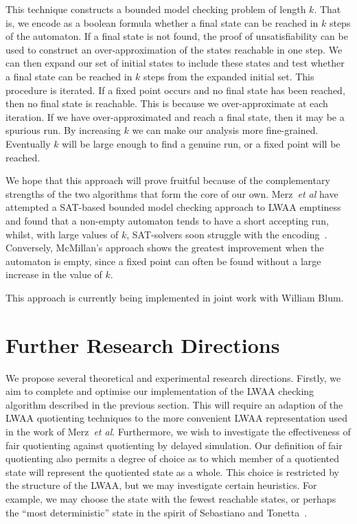 \documentclass{article}
\begin{document}
This technique constructs a bounded model checking problem of length
$k$.  That is, we encode as a boolean formula whether a final state
can be reached in $k$ steps of the automaton.  If a final state is not
found, the proof of unsatisfiability can be used to construct an
over-approximation of the states reachable in one step.  We can then
expand our set of initial states to include these states and test
whether a final state can be reached in $k$ steps from the expanded
initial set.  This procedure is iterated.  If a fixed point occurs and
no final state has been reached, then no final state is reachable.
This is because we over-approximate at each iteration.  If we have
over-approximated and reach a final state, then it may be a spurious
run.  By increasing $k$ we can make our analysis more fine-grained.
Eventually $k$ will be large enough to find a genuine run, or a fixed
point will be reached.

We hope that this approach will prove fruitful because of the
complementary strengths of the two algorithms that form the core of
our own.  Merz~\textit{et al} have attempted a SAT-based bounded model
checking approach to LWAA emptiness and found that a non-empty
automaton tends to have a short accepting run, whilst, with large
values of $k$, SAT-solvers soon struggle with the encoding~\cite{MS03}.
Conversely, McMillan's approach shows the greatest improvement when
the automaton is empty, since a fixed point can often be found without
a large increase in the value of $k$.

This approach is currently being
implemented in joint work with William Blum.


\section*{Further Research Directions}

We propose several theoretical and experimental research directions.
Firstly, we aim to complete and optimise our implementation of the
LWAA checking algorithm described in the previous section.  This will
require an adaption of the LWAA quotienting techniques to the more
convenient LWAA representation used in the work of Merz~\textit{et
al}.  Furthermore, we wish to investigate the effectiveness of fair
quotienting against quotienting by delayed simulation.  Our definition
of fair quotienting also permits a degree of choice as to which member
of a quotiented state will represent the quotiented state as a whole.
This choice is restricted by the structure of the LWAA, but we may
investigate certain heuristics.  For example, we may choose the state
with the fewest reachable states, or perhaps the ``most
deterministic'' state in the spirit of Sebastiano and
Tonetta~\cite{ST03}.
\end{document}
